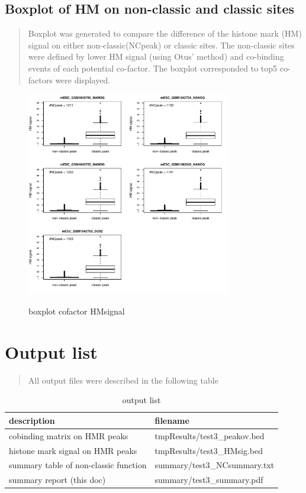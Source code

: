 \documentclass[11pt,a4paper]{article}
\begin{document}
\subsection{Boxplot of HM on non-classic and classic sites}
\begin{quotation}
Boxplot was generated to compare the difference of the histone mark (HM) signal on either non-classic(NCpeak) or classic sites. The non-classic sites were defined by lower HM signal (using Otus' method) and co-binding events of each potential co-factor. The boxplot corresponded to top5 co-factors were displayed.  
\end{quotation}
\begin{figure}[h]
        \caption{boxplot cofactor HMsignal} \label{fig:profileunion}
        \setlength{\abovecaptionskip}{0pt}
        \setlength{\belowcaptionskip}{10pt}
        \centering
        {\includegraphics[width=0.8\textwidth]{test3_coTF_HMsignal.pdf}}
\end{figure}

\newpage
\newpage
\section{Output list}
\begin{quotation}
All output files were described in the following table
\end{quotation}
\begin{table}[h]
\caption{output list}\label{bstable}
\begin{tabularx}{\textwidth}{ |X|l| }
    
\hline
description & filename \\
\hline
cobinding matrix on HMR peaks & tmpResults/test3\_peakov.bed \\
\hline
histone mark signal on HMR peaks & tmpResults/test3\_HMsig.bed \\
\hline
summary table of non-classic function & summary/test3\_NCsummary.txt \\
\hline
summary report (this doc) & summary/test3\_summary.pdf \\
\hline

\end{tabularx}
\end{table} 
\end{document}
